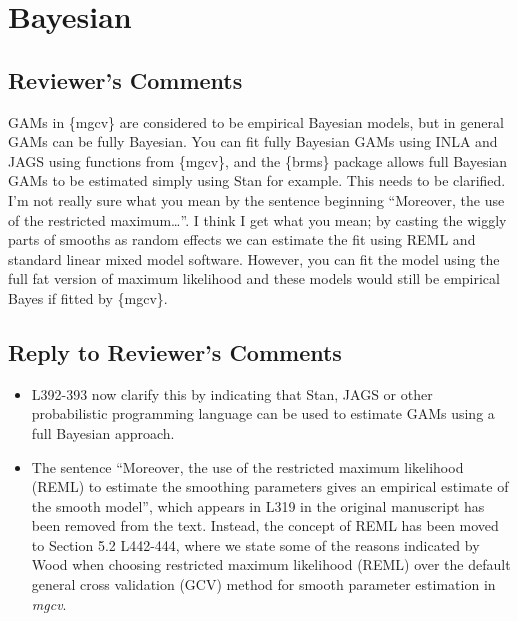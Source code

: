 \documentclass[
]{article}
\begin{document}
\hypertarget{bayesian}{%
\section{Bayesian}\label{bayesian}}

\hypertarget{reviewers-comments-6}{%
\subsection{Reviewer's Comments}\label{reviewers-comments-6}}

GAMs in \{mgcv\} are considered to be empirical Bayesian models, but in general GAMs can be fully Bayesian. You can fit fully Bayesian GAMs using INLA and JAGS using functions from \{mgcv\}, and the \{brms\} package allows full Bayesian GAMs to be estimated simply using Stan for example. This needs to be clarified.
I'm not really sure what you mean by the sentence beginning ``Moreover, the use of the restricted maximum\ldots{}''. I think I get what you mean; by casting the wiggly parts of smooths as random effects we can estimate the fit using REML
and standard linear mixed model software. However, you can fit the model using the full fat version of maximum likelihood and these models would still be empirical Bayes if fitted by \{mgcv\}.

\hypertarget{section-7}{%
\subsection{\texorpdfstring{\textcolor{reviewersblue} {Reply to Reviewer's Comments}}{}}\label{section-7}}

\begin{itemize}
\item
  L392-393 now clarify this by indicating that Stan, JAGS or other probabilistic programming language can be used to estimate GAMs using a full Bayesian approach.
\item
  The sentence ``Moreover, the use of the restricted maximum likelihood (REML) to estimate the smoothing parameters gives an empirical estimate of the smooth model'', which appears in L319 in the original manuscript has been removed from the text. Instead, the concept of REML has been moved to Section 5.2 L442-444, where we state some of the reasons indicated by Wood when choosing restricted maximum likelihood (REML) over the default general cross validation (GCV) method for smooth parameter estimation in \emph{mgcv}.
\end{itemize}
\end{document}

